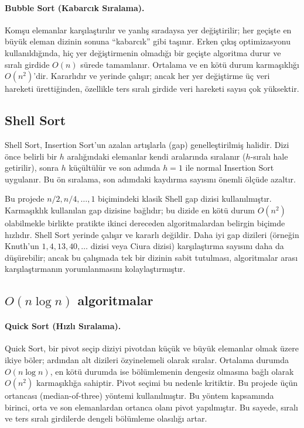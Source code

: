 \documentclass[12pt,a4paper]{article}
\begin{document}
\paragraph{Bubble Sort (Kabarcık Sıralama).}
Komşu elemanlar karşılaştırılır ve yanlış sıradaysa yer değiştirilir; her geçişte
en büyük eleman dizinin sonuna “kabarcık” gibi taşınır. Erken çıkış optimizasyonu
kullanıldığında, hiç yer değiştirmenin olmadığı bir geçişte algoritma durur ve
sıralı girdide $O(n)$ sürede tamamlanır. Ortalama ve en kötü durum karmaşıklığı
$O(n^2)$'dir. Kararlıdır ve yerinde çalışır; ancak her yer değiştirme üç veri
hareketi ürettiğinden, özellikle ters sıralı girdide veri hareketi sayısı çok
yüksektir.

\subsection{Shell Sort}

Shell Sort, Insertion Sort'un azalan artışlarla (gap) genelleştirilmiş halidir. Dizi önce belirli bir $h$ aralığındaki elemanlar kendi
aralarında sıralanır ($h$-sıralı hale getirilir), sonra $h$ küçültülür ve son adımda $h=1$
ile normal Insertion Sort uygulanır. Bu ön sıralama, son adımdaki kaydırma
sayısını önemli ölçüde azaltır.

Bu projede $n/2, n/4, \dots, 1$ biçimindeki klasik Shell gap dizisi
kullanılmıştır. Karmaşıklık kullanılan gap dizisine bağlıdır; bu dizide en kötü
durum $O(n^2)$ olabilmekle birlikte pratikte ikinci dereceden algoritmalardan
belirgin biçimde hızlıdır. Shell Sort yerinde çalışır ve kararlı değildir. Daha
iyi gap dizileri (örneğin Knuth'un $1, 4, 13, 40, \dots$ dizisi veya Ciura
dizisi) karşılaştırma sayısını daha da düşürebilir; ancak bu çalışmada tek bir
dizinin sabit tutulması, algoritmalar arası karşılaştırmanın yorumlanmasını
kolaylaştırmıştır.

\subsection{$O(n \log n)$ algoritmalar}

\paragraph{Quick Sort (Hızlı Sıralama).}
Quick Sort, bir pivot seçip diziyi pivotdan küçük ve büyük elemanlar olmak üzere
ikiye böler; ardından alt dizileri özyinelemeli olarak sıralar.
Ortalama durumda $O(n \log n)$, en kötü durumda ise bölümlemenin dengesiz
olmasına bağlı olarak $O(n^2)$ karmaşıklığa sahiptir. Pivot seçimi bu nedenle
kritiktir. Bu projede üçün ortancası (median-of-three) yöntemi kullanılmıştır.
Bu yöntem kapsamında birinci, orta ve son elemanlardan ortanca olanı pivot yapılmıştır.
Bu sayede, sıralı ve ters sıralı girdilerde dengeli bölümleme olasılığı artar.
\end{document}
